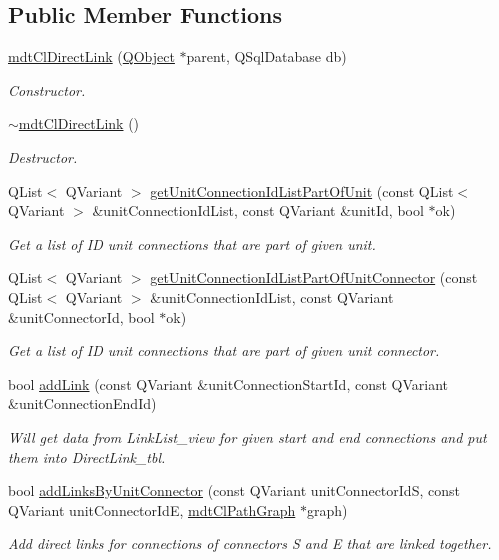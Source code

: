 \subsection*{Public Member Functions}
\begin{DoxyCompactItemize}
\item 
\hyperlink{classmdt_cl_direct_link_a6a5a5512fdac07d478af18c3c99763fd}{mdt\-Cl\-Direct\-Link} (\hyperlink{class_q_object}{Q\-Object} $\ast$parent, Q\-Sql\-Database db)
\begin{DoxyCompactList}\small\item\em Constructor. \end{DoxyCompactList}\item 
\hyperlink{classmdt_cl_direct_link_a4b6d24e71f1e9e4f5917176f6101c4a8}{$\sim$mdt\-Cl\-Direct\-Link} ()
\begin{DoxyCompactList}\small\item\em Destructor. \end{DoxyCompactList}\item 
Q\-List$<$ Q\-Variant $>$ \hyperlink{classmdt_cl_direct_link_a1922ecf2c70985461a2b20700404ef7e}{get\-Unit\-Connection\-Id\-List\-Part\-Of\-Unit} (const Q\-List$<$ Q\-Variant $>$ \&unit\-Connection\-Id\-List, const Q\-Variant \&unit\-Id, bool $\ast$ok)
\begin{DoxyCompactList}\small\item\em Get a list of I\-D unit connections that are part of given unit. \end{DoxyCompactList}\item 
Q\-List$<$ Q\-Variant $>$ \hyperlink{classmdt_cl_direct_link_acc3e005886f9dad09c9843df81b439e4}{get\-Unit\-Connection\-Id\-List\-Part\-Of\-Unit\-Connector} (const Q\-List$<$ Q\-Variant $>$ \&unit\-Connection\-Id\-List, const Q\-Variant \&unit\-Connector\-Id, bool $\ast$ok)
\begin{DoxyCompactList}\small\item\em Get a list of I\-D unit connections that are part of given unit connector. \end{DoxyCompactList}\item 
bool \hyperlink{classmdt_cl_direct_link_a800b3cee7ef1acbe9271e698d62e6bf8}{add\-Link} (const Q\-Variant \&unit\-Connection\-Start\-Id, const Q\-Variant \&unit\-Connection\-End\-Id)
\begin{DoxyCompactList}\small\item\em Will get data from Link\-List\-\_\-view for given start and end connections and put them into Direct\-Link\-\_\-tbl. \end{DoxyCompactList}\item 
bool \hyperlink{classmdt_cl_direct_link_aa7a155c3bf99b91e2d9cff85e93f332b}{add\-Links\-By\-Unit\-Connector} (const Q\-Variant unit\-Connector\-Id\-S, const Q\-Variant unit\-Connector\-Id\-E, \hyperlink{classmdt_cl_path_graph}{mdt\-Cl\-Path\-Graph} $\ast$graph)
\begin{DoxyCompactList}\small\item\em Add direct links for connections of connectors S and E that are linked together. \end{DoxyCompactList}\end{DoxyCompactItemize}
